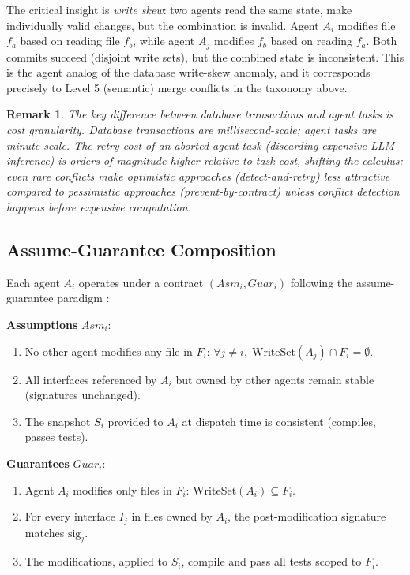 \documentclass[11pt, a4paper]{googledeepmind}
\newtheorem*{remark}{Remark}
\begin{document}
The critical insight is \emph{write skew}: two agents read the same state, make individually valid changes, but the combination is invalid. Agent $A_i$ modifies file $f_a$ based on reading file $f_b$, while agent $A_j$ modifies $f_b$ based on reading $f_a$. Both commits succeed (disjoint write sets), but the combined state is inconsistent. This is the agent analog of the database write-skew anomaly, and it corresponds precisely to Level 5 (semantic) merge conflicts in the taxonomy above.

\begin{remark}
The key difference between database transactions and agent tasks is cost granularity. Database transactions are millisecond-scale; agent tasks are minute-scale. The retry cost of an aborted agent task (discarding expensive LLM inference) is orders of magnitude higher relative to task cost, shifting the calculus: even rare conflicts make optimistic approaches (detect-and-retry) less attractive compared to pessimistic approaches (prevent-by-contract) unless conflict detection happens before expensive computation.
\end{remark}

\subsection{Assume-Guarantee Composition}

Each agent $A_i$ operates under a contract $(Asm_i, Guar_i)$ following the assume-guarantee paradigm \citep{meyer1992, henzinger2002}:

\medskip
\noindent\textbf{Assumptions} $Asm_i$:
\begin{enumerate}[nosep, label=(A\arabic*)]
    \item No other agent modifies any file in $F_i$: $\forall j \neq i, \; \mathrm{WriteSet}(A_j) \cap F_i = \emptyset$.
    \item All interfaces referenced by $A_i$ but owned by other agents remain stable (signatures unchanged).
    \item The snapshot $S_i$ provided to $A_i$ at dispatch time is consistent (compiles, passes tests).
\end{enumerate}

\noindent\textbf{Guarantees} $Guar_i$:
\begin{enumerate}[nosep, label=(G\arabic*)]
    \item Agent $A_i$ modifies only files in $F_i$: $\mathrm{WriteSet}(A_i) \subseteq F_i$.
    \item For every interface $I_j$ in files owned by $A_i$, the post-modification signature matches $\mathrm{sig}_j$.
    \item The modifications, applied to $S_i$, compile and pass all tests scoped to $F_i$.
\end{enumerate}
\end{document}
